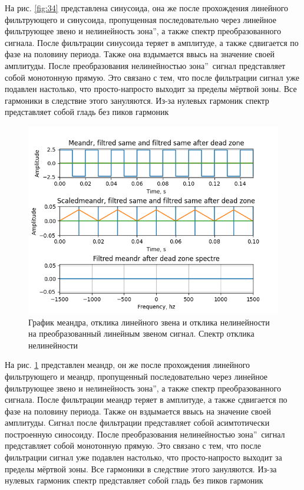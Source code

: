 На рис. \ref{fig:34} представлена синусоида, она же после прохождения
линейного фильтрующего и синусоида, пропущенная последовательно через линейное
фильтрующее звено и нелинейность  зона\textquotedblright,
а также спектр преобразованного сигнала. После фильтрации синусоида теряет в амплитуде,
а также сдвигается по фазе на половину периода. Также она вздымается ввысь на значение
своей амплитуды. После преобразования нелинейностью
 зона\textquotedblright\ сигнал представляет собой монотонную
прямую. Это связано с тем, что после фильтрации сигнал уже подавлен настолько, что
просто-напросто выходит за пределы мёртвой зоны. Все гармоники в следствие этого 
зануляются. Из-за нулевых гармоник спектр представляет собой гладь без пиков гармоник

\begin{figure}[H]
	\centering
	\includegraphics[width=1.05\linewidth]{body/images/filtred-meandr-after-dead-zone-and-its-spectre.png}
	\caption{График меандра, отклика линейного звена и отклика нелинейности на преобразованный
	линейным звеном сигнал. Спектр отклика нелинейности}
	\label{fig:35}
\end{figure}

На рис. \ref{fig:35} представлен меандр, он же после прохождения
линейного фильтрующего и меандр, пропущенный последовательно через линейное
фильтрующее звено и нелинейность  зона\textquotedblright,
а также спектр преобразованного сигнала. После фильтрации меандр теряет в амплитуде,
а также сдвигается по фазе на половину периода. Также он вздымается ввысь на значение
своей амплитуды. Сигнал после фильтрации представляет собой асимтотически построенную
синосоиду. После преобразования нелинейностью
 зона\textquotedblright\ сигнал представляет собой монотонную
прямую. Это связано с тем, что после фильтрации сигнал уже подавлен настолько, что
просто-напросто выходит за пределы мёртвой зоны. Все гармоники в следствие этого 
зануляются. Из-за нулевых гармоник спектр представляет собой гладь без пиков гармоник

